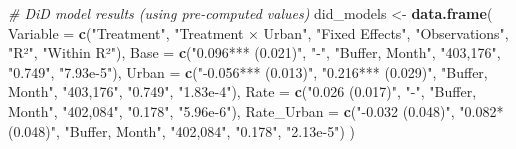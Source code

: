 \documentclass[
]{article}
\newenvironment{Shaded}{\begin{snugshade}}{\end{snugshade}}
\newcommand{\AttributeTok}[1]{\textcolor[rgb]{0.13,0.29,0.53}{#1}}
\newcommand{\CommentTok}[1]{\textcolor[rgb]{0.56,0.35,0.01}{\textit{#1}}}
\newcommand{\FunctionTok}[1]{\textcolor[rgb]{0.13,0.29,0.53}{\textbf{#1}}}
\newcommand{\NormalTok}[1]{#1}
\newcommand{\OtherTok}[1]{\textcolor[rgb]{0.56,0.35,0.01}{#1}}
\newcommand{\StringTok}[1]{\textcolor[rgb]{0.31,0.60,0.02}{#1}}
\begin{document}
\begin{Shaded}
\begin{Highlighting}[]
\CommentTok{\# DiD model results (using pre{-}computed values)}
\NormalTok{did\_models }\OtherTok{\textless{}{-}} \FunctionTok{data.frame}\NormalTok{(}
  \AttributeTok{Variable =} \FunctionTok{c}\NormalTok{(}\StringTok{"Treatment"}\NormalTok{, }\StringTok{"Treatment × Urban"}\NormalTok{, }\StringTok{"Fixed Effects"}\NormalTok{, }\StringTok{"Observations"}\NormalTok{, }\StringTok{"R²"}\NormalTok{, }\StringTok{"Within R²"}\NormalTok{),}
  \AttributeTok{Base =} \FunctionTok{c}\NormalTok{(}\StringTok{"0.096*** (0.021)"}\NormalTok{, }\StringTok{"{-}"}\NormalTok{, }\StringTok{"Buffer, Month"}\NormalTok{, }\StringTok{"403,176"}\NormalTok{, }\StringTok{"0.749"}\NormalTok{, }\StringTok{"7.93e{-}5"}\NormalTok{),}
  \AttributeTok{Urban =} \FunctionTok{c}\NormalTok{(}\StringTok{"{-}0.056*** (0.013)"}\NormalTok{, }\StringTok{"0.216*** (0.029)"}\NormalTok{, }\StringTok{"Buffer, Month"}\NormalTok{, }\StringTok{"403,176"}\NormalTok{, }\StringTok{"0.749"}\NormalTok{, }\StringTok{"1.83e{-}4"}\NormalTok{),}
  \AttributeTok{Rate =} \FunctionTok{c}\NormalTok{(}\StringTok{"0.026 (0.017)"}\NormalTok{, }\StringTok{"{-}"}\NormalTok{, }\StringTok{"Buffer, Month"}\NormalTok{, }\StringTok{"402,084"}\NormalTok{, }\StringTok{"0.178"}\NormalTok{, }\StringTok{"5.96e{-}6"}\NormalTok{),}
  \AttributeTok{Rate\_Urban =} \FunctionTok{c}\NormalTok{(}\StringTok{"{-}0.032 (0.048)"}\NormalTok{, }\StringTok{"0.082* (0.048)"}\NormalTok{, }\StringTok{"Buffer, Month"}\NormalTok{, }\StringTok{"402,084"}\NormalTok{, }\StringTok{"0.178"}\NormalTok{, }\StringTok{"2.13e{-}5"}\NormalTok{)}
\NormalTok{)}


\end{Highlighting}
\end{Shaded}
\end{document}
